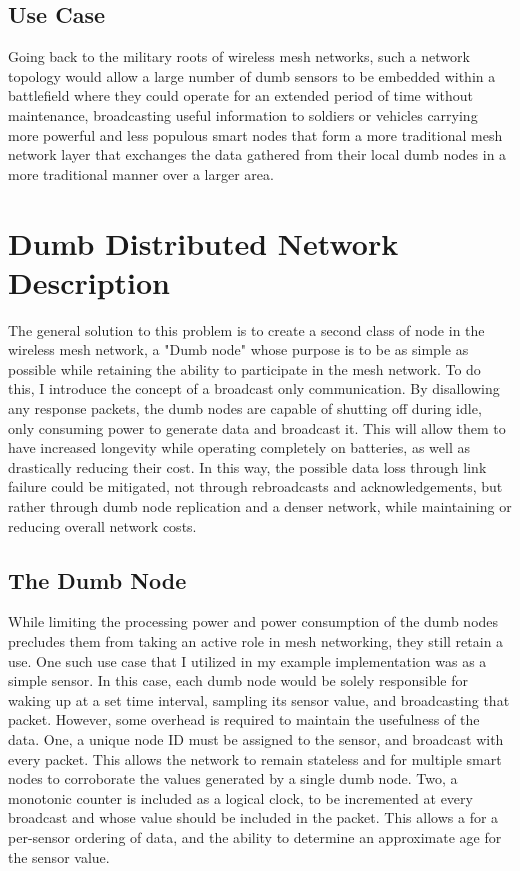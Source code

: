 \documentclass{article}
\begin{document}
\subsection{Use Case}

Going back to the military roots of wireless mesh networks, such a network topology would allow a large number of dumb sensors to be embedded within a battlefield where they could operate for an extended period of time without maintenance, broadcasting useful information to soldiers or vehicles carrying more powerful and less populous smart nodes that form a more traditional mesh network layer that exchanges the data gathered from their local dumb nodes in a more traditional manner over a larger area.

\section{Dumb Distributed Network Description}

The general solution to this problem is to create a second class of node in the wireless mesh network, a "Dumb node" whose purpose is to be as simple as possible while retaining the ability to participate in the mesh network. To do this, I introduce the concept of a broadcast only communication. By disallowing any response packets, the dumb nodes are capable of shutting off during idle, only consuming power to generate data and broadcast it. This will allow them to have increased longevity while operating completely on batteries, as well as drastically reducing their cost. In this way, the possible data loss through link failure could be mitigated, not through rebroadcasts and acknowledgements, but rather through dumb node replication and a denser network, while maintaining or reducing overall network costs. 

\subsection{The Dumb Node}

While limiting the processing power and power consumption of the dumb nodes precludes them from taking an active role in mesh networking, they still retain a use. One such use case that I utilized in my example implementation was as a simple sensor. In this case, each dumb node would be solely responsible for waking up at a set time interval, sampling its sensor value, and broadcasting that packet. However, some overhead is required to maintain the usefulness of the data. One, a unique node ID must be assigned to the sensor, and broadcast with every packet. This allows the network to remain stateless and for multiple smart nodes to corroborate the values generated by a single dumb node. Two, a monotonic counter is included as a logical clock, to be incremented at every broadcast and whose value should be included in the packet. This allows a for a per-sensor ordering of data, and the ability to determine an approximate age for the sensor value.
\end{document}
